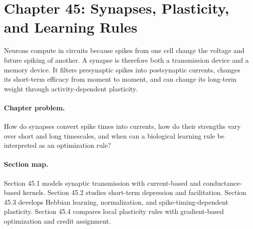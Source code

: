 \section{Chapter 45: Synapses, Plasticity, and Learning Rules}
\label{ch:synapses-plasticity-learning-rules}

Neurons compute in circuits because spikes from one cell change the voltage and future spiking of another. A synapse is therefore both a transmission device and a memory device. It filters presynaptic spikes into postsynaptic currents, changes its short-term efficacy from moment to moment, and can change its long-term weight through activity-dependent plasticity.

\paragraph{Chapter problem.}
How do synapses convert spike times into currents, how do their strengths vary over short and long timescales, and when can a biological learning rule be interpreted as an optimization rule?

\paragraph{Section map.}
Section 45.1 models synaptic transmission with current-based and conductance-based kernels. Section 45.2 studies short-term depression and facilitation. Section 45.3 develops Hebbian learning, normalization, and spike-timing-dependent plasticity. Section 45.4 compares local plasticity rules with gradient-based optimization and credit assignment.

